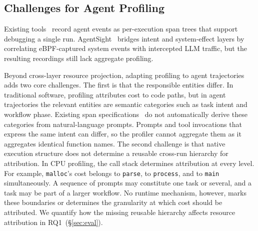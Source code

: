 \documentclass[letterpaper]{article}
\begin{document}
\subsection{Challenges for Agent Profiling}

Existing tools~\cite{langsmith,langfuse,phoenix,otel} record agent
events as per-execution span trees that support debugging a single run.
AgentSight~\cite{agentsight} bridges intent and system-effect layers
by correlating eBPF-captured system events with intercepted LLM
traffic, but the resulting recordings still lack aggregate profiling.


Beyond cross-layer resource projection, adapting profiling to agent
trajectories adds two core challenges.
The first is that the responsible entities differ.
In traditional software, profiling attributes cost to code paths, but
in agent trajectories the relevant entities are semantic categories
such as task intent and workflow phase.
Existing span specifications~\cite{otel,openinference} do not automatically derive
these categories from natural-language prompts. Prompts and tool invocations that express the
same intent can differ, so the profiler cannot aggregate them as it aggregates
identical function names.
The second challenge is that native execution structure does not determine a
reusable cross-run hierarchy for attribution.
In CPU profiling, the call stack determines attribution at every level. For
example, \texttt{malloc}'s cost belongs to \texttt{parse}, to \texttt{process},
and to \texttt{main} simultaneously.
A sequence of prompts may constitute one task or several, and a task may be
part of a larger workflow. No runtime mechanism, however, marks these
boundaries or determines the granularity at which cost should be attributed.
We quantify how the missing reusable hierarchy affects resource attribution
in RQ1~(\S\ref{sec:eval}).
\end{document}
